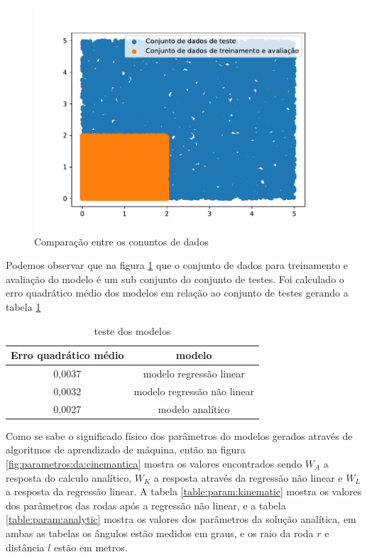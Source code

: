 \begin{figure}[H]
    \label{fig:conj:dados}
    \centering
    \includegraphics[scale=0.3]{figuras/conj_dados.pdf}
    \caption{Comparação entre os conuntos de dados}
\end{figure}

Podemos observar que na figura \ref{fig:conj:dados} que o conjunto
de dados para treinamento e avaliação do modelo 
é um sub conjunto do conjunto de testes. Foi calculado o erro quadrático
médio dos modelos em relação ao conjunto de testes gerando a
tabela \ref{table:mse:test}


\begin{table}[H]
    \label{table:mse:test}
    \centering
    \begin{tabular}{c|c}
        \hline
        Erro quadrático médio & modelo \\
        \hline
        0,0037 & modelo regressão linear \\
        \hline
        0,0032 & modelo regressão não linear \\
        \hline
        0,0027 & modelo analítico \\
        \hline
    \end{tabular}
    \caption{teste dos modelos}
\end{table}

Como se sabe o significado físico dos parâmetros do modelos gerados
através de algoritmos de aprendizado de máquina, então na figura
\ref{fig:parametros:da:cinemantica} mostra os valores encontrados
sendo $W_{A}$ a resposta do calculo analítico, $W_{K}$ a resposta
através da regressão não linear e $W_{L}$ a resposta da regressão
linear. A tabela \ref{table:param:kinematic} mostra os valores
dos parâmetros das rodas após a regressão não linear, e a tabela
\ref{table:param:analytic} mostra os valores dos parâmetros da
solução analítica, em ambas as tabelas os ângulos estão medidos
em graus, e os raio da roda $r$ e distância $l$ estão em metros.
 


